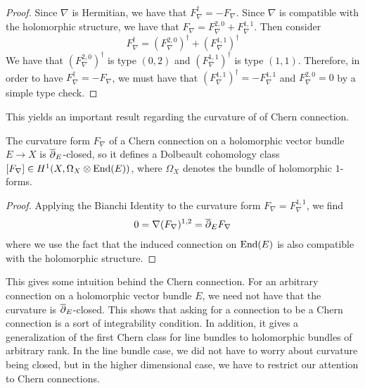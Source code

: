 %
\begin{proof}
Since $\nabla$ is Hermitian, we have that $F_\nabla^\dagger = - F_\nabla$.
Since $\nabla$ is compatible with the holomorphic structure, we have that
$F_\nabla = F^{2,0}_\nabla + F^{1,1}_\nabla$. Then consider
\[
F_\nabla^\dagger = (F^{2,0}_\nabla)^\dagger + (F^{1,1}_\nabla)^\dagger
\]
We have that $(F^{2,0}_\nabla)^\dagger$ is type $(0,2)$ and $(F^{1,1}_\nabla)^\dagger$
is type $(1,1)$. Therefore, in order to have $F_\nabla^\dagger = -F_\nabla$, we
must have that $(F^{1,1}_\nabla)^\dagger = -F^{1,1}_\nabla$ and $F^{2,0}_\nabla = 0$
by a simple type check.
\end{proof}
%
This yields an important result regarding the curvature of of Chern connection.
%
\begin{thm}
The curvature form $F_\nabla$ of a Chern connection on a holomorphic vector
bundle $E \to X$ is $\overline{\partial}_E$-closed, so it defines a Dolbeault cohomology class
$[F_\nabla] \in H^1(X, \Omega_X \otimes \operatorname{End}(E))$, where $\Omega_X$ denotes the
bundle of holomorphic $1$-forms.
\end{thm}
%
\begin{proof}
Applying the Bianchi Identity to the curvature form $F_\nabla = F_\nabla^{1,1}$,
we find
\begin{align*}
0 = \nabla(F_\nabla)^{1,2} = \overline{\partial}_E F_\nabla
\end{align*}
where we use the fact that the induced connection on $\operatorname{End}(E)$ is also
compatible with the holomorphic structure.
\end{proof}
%
This gives some intuition behind the Chern connection. For an arbitrary connection on
a holomorphic vector bundle $E$, we need not have that the curvature is
$\overline{\partial}_E$-closed. This shows that asking for a connection to be a Chern connection
is a sort of integrability condition. In addition, it gives a generalization of the
first Chern class for line bundles to holomorphic bundles of arbitrary rank. In
the line bundle case, we did not have to worry about curvature being closed,
but in the higher dimensional case, we have to restrict our attention to Chern
connections.

